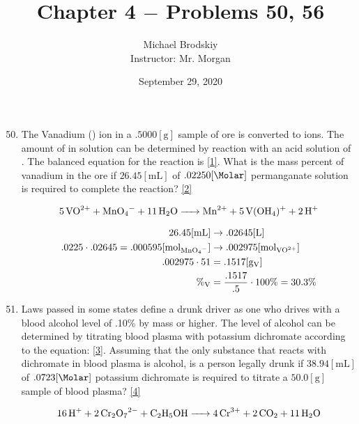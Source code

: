 \documentclass[12pt]{article}
\title{Chapter 4 $-$ Problems 50, 56}
\date{September 29, 2020}
\author{Michael Brodskiy\\ \small Instructor: Mr. Morgan}
\begin{document}
\maketitle

\begin{enumerate}

    \setcounter{enumi}{49}
  \item The Vanadium () ion in a $.5000[\si{\gram}]$ sample of ore is converted to  ions. The amount of  in solution can be determined by reaction with an acid solution of . The balanced equation for the reaction is \eqref{1}. What is the mass percent of vanadium in the ore if $26.45[\si{\milli\liter}]$ of $.02250[\si{\Molar}]$ permanganate solution is required to complete the reaction? \eqref{2}

    \begin{equation}
      \ce{5VO^{2+} + MnO4^- + 11H2O -> Mn^{2+} + 5V(OH4)^+ + 2H^+}
      \label{1}
    \end{equation}

    \begin{equation}
      \begin{split}
        26.45[\si{\milli\liter}]&\rightarrow .02645[\si{\liter}] \\
          .0225\cdot.02645=.000595[\si{\mole}_{\ce{MnO4^-}}]&\rightarrow .002975[\si{\mole}_{\ce{VO^{2+}}}] \\
          .002975\cdot51&=.1517[\si{\gram}_{\ce{V}}]\\
          \%_{\ce{V}}&=\frac{.1517}{.5}\cdot100\%=30.3\%\\
      \end{split}
      \label{2}
    \end{equation}


    \setcounter{enumi}{55}
  \item Laws passed in some states define a drunk driver as one who drives with a blood alcohol level of .10\% by mass or higher. The level of alcohol can be determined by titrating blood plasma with potassium dichromate according to the equation: \eqref{3}. Assuming that the only substance that reacts with dichromate in blood plasma is alcohol, is a person legally drunk if $38.94[\si{\milli\liter}]$ of $.0723[\si{\Molar}]$ potassium dichromate is required to titrate a $50.0[\si{\gram}]$ sample of blood plasma? \eqref{4}

    \begin{equation}
      \ce{16H^+ + 2Cr2O7^{2-} + C2H5OH -> 4Cr^{3+} + 2CO2 + 11H2O}
      \label{3}
    \end{equation}


\end{enumerate}
\end{document}
